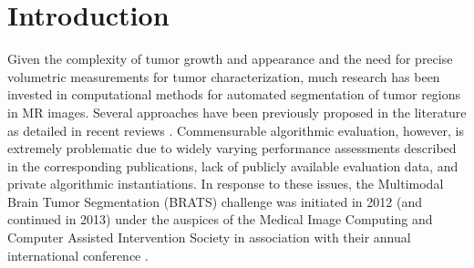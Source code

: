 \documentclass[preprint,authoryear,review,12pt]{elsarticle}
\begin{document}
%
%
\newpage







%
%
%


%
%

\section{Introduction}
Given the complexity of tumor growth and appearance and the need
for precise volumetric measurements for tumor characterization, 
much research has been invested in computational methods for 
automated segmentation of tumor regions in MR images.  Several 
approaches have been previously proposed in the literature as
detailed in recent reviews \citep{angelini2007,bauer2013}.  
Commensurable algorithmic evaluation, however, is
extremely problematic due to widely varying performance assessments
described in the corresponding publications, lack of publicly available 
evaluation data, and private algorithmic instantiations.  
In response to these issues, the Multimodal Brain Tumor Segmentation 
(BRATS) challenge was initiated in 2012 (and continued in 2013) under 
the auspices of the Medical Image Computing and Computer Assisted 
Intervention Society in association with their annual international 
conference \citep{menze2014}.
\end{document}
